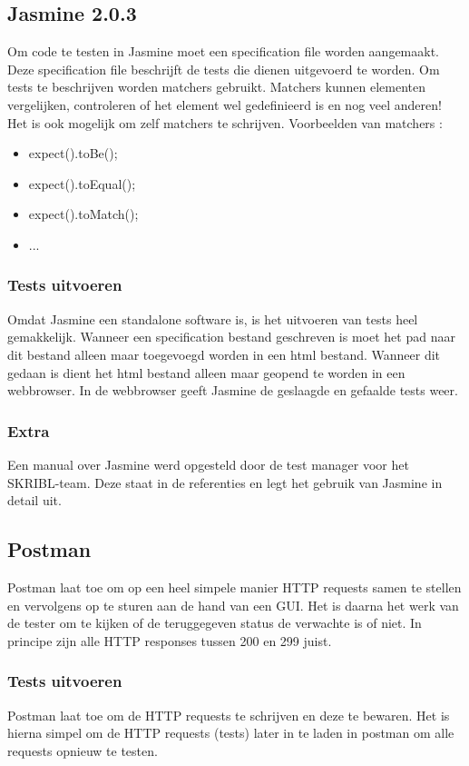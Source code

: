 \documentclass{article}
\begin{document}
\subsection{Jasmine 2.0.3}
Om code te testen in Jasmine moet een specification file worden aangemaakt. Deze specification file beschrijft de tests die dienen uitgevoerd te worden. 
\newline
Om tests te beschrijven worden matchers gebruikt. Matchers kunnen elementen vergelijken, controleren of het element wel gedefinieerd is en nog veel anderen! Het is ook mogelijk om zelf matchers te schrijven.
Voorbeelden van matchers :
\begin{itemize}
  \item expect().toBe();
  \item expect().toEqual();
  \item expect().toMatch();
  \item ...
\end{itemize}
%
\subsubsection{Tests uitvoeren}
Omdat Jasmine een standalone software is, is het uitvoeren van tests heel gemakkelijk. Wanneer een specification bestand geschreven is moet het pad naar dit bestand alleen maar toegevoegd worden in een html bestand. Wanneer dit gedaan is dient het html bestand alleen maar geopend te worden in een webbrowser. In de webbrowser geeft Jasmine de geslaagde en gefaalde tests weer.
%
\subsubsection{Extra}
Een manual over Jasmine werd opgesteld door de test manager voor het SKRIBL-team. Deze staat in de referenties en legt het gebruik van Jasmine in detail uit.
%
\subsection{Postman}
Postman laat toe om op een heel simpele manier HTTP requests samen te stellen en vervolgens op te sturen aan de hand van een GUI. Het is daarna het werk van de tester om te kijken of de teruggegeven status de verwachte is of niet. In principe zijn alle HTTP responses tussen 200 en 299 juist.
%
\subsubsection{Tests uitvoeren}
Postman laat toe om de HTTP requests te schrijven en deze te bewaren. Het is hierna simpel om de HTTP requests (tests) later in te laden in postman om alle requests opnieuw te testen.
%
\end{document}
